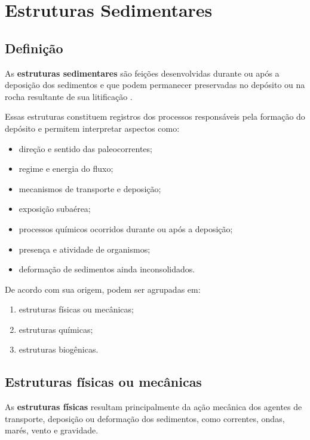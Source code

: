 \section{Estruturas Sedimentares}

\subsection{Definição}

As \textbf{estruturas sedimentares} são feições desenvolvidas durante ou após a
deposição dos sedimentos e que podem permanecer preservadas no depósito ou na
rocha resultante de sua litificação \parencite{harms1975,nichols2009}.

Essas estruturas constituem registros dos processos responsáveis pela formação
do depósito e permitem interpretar aspectos como:

\begin{itemize}
    \item direção e sentido das paleocorrentes;
    \item regime e energia do fluxo;
    \item mecanismos de transporte e deposição;
    \item exposição subaérea;
    \item processos químicos ocorridos durante ou após a deposição;
    \item presença e atividade de organismos;
    \item deformação de sedimentos ainda inconsolidados.
\end{itemize}

De acordo com sua origem, podem ser agrupadas em:

\begin{enumerate}
    \item estruturas físicas ou mecânicas;
    \item estruturas químicas;
    \item estruturas biogênicas.
\end{enumerate}

\subsection{Estruturas físicas ou mecânicas}

As \textbf{estruturas físicas} resultam principalmente da ação mecânica dos
agentes de transporte, deposição ou deformação dos sedimentos, como correntes,
ondas, marés, vento e gravidade.

